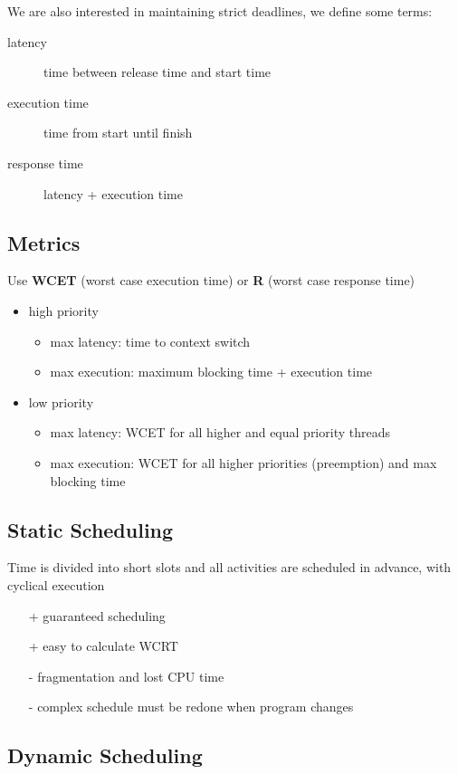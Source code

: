 \documentclass[]{article}
\theoremstyle{definition}
\begin{document}
	We are also interested in maintaining strict deadlines, we define some terms:
	\begin{description}
		\item[latency] time between release time and start time
		\item[execution time] time from start until finish
		\item[response time] latency + execution time
	\end{description}

	\subsection{Metrics}
	Use \textbf{WCET} (worst case execution time) or \textbf{R} (worst case response time)
	\begin{itemize}
		\item high priority
			\begin{itemize}
				\item max latency: time to context switch
				\item max execution: maximum blocking time + execution time
			\end{itemize}
		\item low priority
			\begin{itemize}
				\item max latency: WCET for all higher and equal priority threads
				\item max execution: WCET for all higher priorities (preemption) and max blocking time
			\end{itemize}
	\end{itemize}

	\subsection{Static Scheduling}
	Time is divided into short slots and all activities are scheduled in advance, with cyclical execution
	\begin{itemize}
		\item[+] guaranteed scheduling
		\item[+] easy to calculate WCRT
		\item[-] fragmentation and lost CPU time
		\item[-] complex schedule must be redone when program changes
	\end{itemize}

	\subsection{Dynamic Scheduling}
\end{document}
